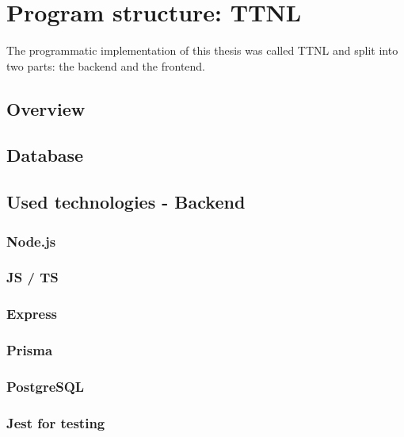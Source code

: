 \section{Program structure: \acf{TTNL}}\label{section:ttnl}

The programmatic implementation of this thesis was called \acf{TTNL} and split into two parts: the backend and the frontend.

\subsection{Overview}


\subsection{Database}


\subsection{Used technologies - Backend}


\subsubsection{Node.js}

\subsubsection{\acf{JS} / \acf{TS}}

\subsubsection{Express}

\subsubsection{Prisma}

\subsubsection{PostgreSQL}

\subsubsection{Jest for testing}

